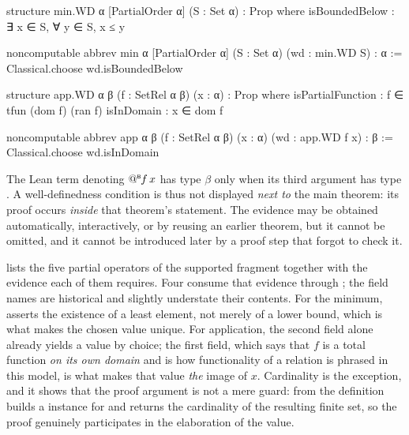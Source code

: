 \begin{leanlisting}[title={Proof-relevant encodings of the minimum of a set and of
    relational application.}, label={lst:barrel-partial-definitions}, float=t]
structure min.WD {α} [PartialOrder α] (S : Set α) : Prop where
  isBoundedBelow : ∃ x ∈ S, ∀ y ∈ S, x ≤ y

noncomputable abbrev min {α} [PartialOrder α]
    (S : Set α) (wd : min.WD S) : α :=
  Classical.choose wd.isBoundedBelow

structure app.WD {α β} (f : SetRel α β) (x : α) : Prop where
  isPartialFunction : f ∈ tfun (dom f) (ran f)
  isInDomain        : x ∈ dom f

noncomputable abbrev app {α β}
    (f : SetRel α β) (x : α) (wd : app.WD f x) : β :=
  Classical.choose wd.isInDomain
\end{leanlisting}

The Lean term denoting \(\mathord{@^{\scriptscriptstyle{\mathsf{B}}}\mkern-1mu} f\,x\) has type \(\beta\) only when its third argument has
type .
A well-definedness condition is thus not displayed \emph{next to} the main theorem: its
proof occurs \emph{inside} that theorem's statement.
The evidence may be obtained automatically, interactively, or by reusing an earlier
theorem, but it cannot be omitted, and it cannot be introduced later by a proof step that
forgot to check it.

 lists the five partial operators of the supported fragment
together with the evidence each of them requires.
Four consume that evidence through ; the field names are
historical and slightly understate their contents.
For the minimum,  asserts the existence of a least element, not
merely of a lower bound, which is what makes the chosen value unique.
For application, the second field alone already yields a value by choice; the first field,
which says that \(f\) is a total function \emph{on its own domain} and is how functionality
of a relation is phrased in this model, is what makes that value \emph{the} image of \(x\).
Cardinality is the exception, and it shows that the proof argument is not a mere guard:
from  the definition builds a 
instance for  and returns the cardinality of the resulting finite set, so the
proof genuinely participates in the elaboration of the value.

